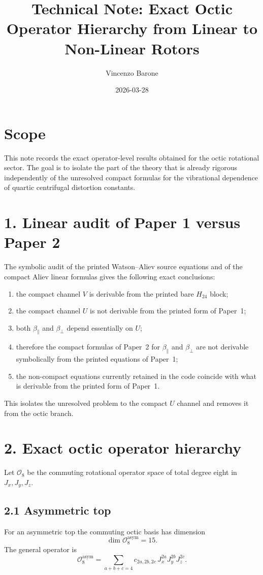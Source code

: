 \documentclass[11pt]{article}
\title{Technical Note: Exact Octic Operator Hierarchy from Linear to Non-Linear Rotors}
\author{Vincenzo Barone}
\date{2026-03-28}
\begin{document}
\maketitle

\section*{Scope}
This note records the exact operator-level results obtained for the octic
rotational sector. The goal is to isolate the part of the theory that is
already rigorous independently of the unresolved compact formulas for the
vibrational dependence of quartic centrifugal distortion constants.

\section*{1. Linear audit of Paper 1 versus Paper 2}
The symbolic audit of the printed Watson--Aliev source equations and of the
compact Aliev linear formulas gives the following exact conclusions:
\begin{enumerate}
\item the compact channel $V$ is derivable from the printed bare $H_{24}$ block;
\item the compact channel $U$ is not derivable from the printed form of
Paper~1;
\item both $\beta_{\parallel}$ and $\beta_{\perp}$ depend essentially on $U$;
\item therefore the compact formulas of Paper~2 for $\beta_{\parallel}$ and
$\beta_{\perp}$ are not derivable symbolically from the printed equations of
Paper~1;
\item the non-compact equations currently retained in the code coincide with
what is derivable from the printed form of Paper~1.
\end{enumerate}

This isolates the unresolved problem to the compact $U$ channel and removes it
from the octic branch.

\section*{2. Exact octic operator hierarchy}
Let $\mathcal O_8$ be the commuting rotational operator space of total degree
eight in $J_x,J_y,J_z$.

\subsection*{2.1 Asymmetric top}
For an asymmetric top the commuting octic basis has dimension
\[
\dim \mathcal O_8^{\mathrm{asym}} = 15.
\]
The general operator is
\[
\mathcal O_8^{\mathrm{asym}}
=
\sum_{a+b+c=4} c_{2a,2b,2c}\,J_x^{2a}J_y^{2b}J_z^{2c}.
\]
\end{document}
